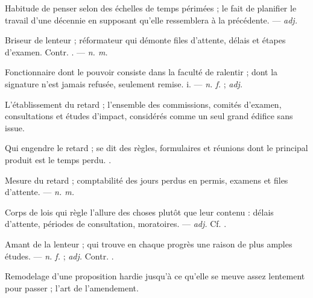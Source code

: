  Habitude de penser selon des échelles de temps périmées ; le fait de planifier le travail d'une décennie en supposant qu'elle ressemblera à la précédente. ---  \textit{adj.}

 Briseur de lenteur ; réformateur qui démonte files d'attente, délais et étapes d'examen. Contr. . ---  \textit{n. m.}

 Fonctionnaire dont le pouvoir consiste dans la faculté de ralentir ; dont la signature n'est jamais refusée, seulement remise.   i. ---  \textit{n. f.} ;  \textit{adj.}

  L'établissement du retard ; l'ensemble des commissions, comités d'examen, consultations et études d'impact, considérés comme un seul grand édifice sans issue.

 Qui engendre le retard ; se dit des règles, formulaires et réunions dont le principal produit est le temps perdu. .

 Mesure du retard ; comptabilité des jours perdus en permis, examens et files d'attente. ---  \textit{n. m.}

 Corps de lois qui règle l'allure des choses plutôt que leur contenu : délais d'attente, périodes de consultation, moratoires. ---  \textit{adj.} Cf. .

 Amant de la lenteur ; qui trouve en chaque progrès une raison de plus amples études. ---  \textit{n. f.} ;  \textit{adj.} Contr. .

 Remodelage d'une proposition hardie jusqu'à ce qu'elle se meuve assez lentement pour passer ; l'art de l'amendement.  
